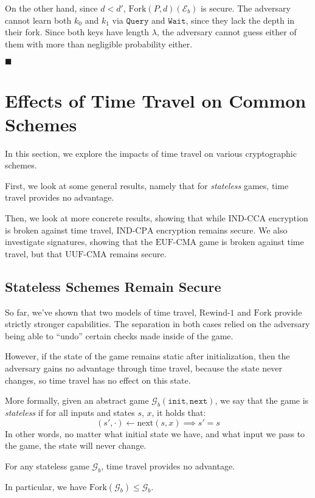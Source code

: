 On the other hand, since $d < d'$, $\text{Fork}(P, d)(\mathcal{E}_b)$
is secure.
The adversary cannot learn both $k_0$ and $k_1$ via $\texttt{Query}$
and $\texttt{Wait}$, since they lack the depth in their fork.
Since both keys have length $\lambda$, the adversary cannot guess
either of them with more than negligible probability either.


$\blacksquare$

\section{Effects of Time Travel on Common Schemes}
\label{sec:effect}

In this section, we explore the impacts of time travel on various
cryptographic schemes.

First, we look at some general results, namely that for \emph{stateless}
games, time travel provides no advantage.

Then, we look at more concrete results, showing that while $\text{IND-CCA}$
encryption is broken against time travel, $\text{IND-CPA}$ encryption
remains secure.
We also investigate signatures, showing that the $\text{EUF-CMA}$
game is broken against time travel, but that $\text{UUF-CMA}$ remains secure.

\subsection{Stateless Schemes Remain Secure}

So far, we've shown that two models of time travel, $\text{Rewind-1}$
and $\text{Fork}$ provide strictly stronger capabilities.
The separation in both cases relied on the adversary being able to
``undo'' certain checks made inside of the game.

However, if the state of the game remains static after initialization,
then the adversary gains no advantage through time travel,
because the state never changes, so time travel has no effect on this
state.

More formally, given an abstract game $\mathcal{G}_b(\texttt{init}, \texttt{next})$,
we say that the game is \emph{stateless} if for all inputs and states $s$, $x$, it holds that:
$$
(s', \cdot) \gets \text{next}(s, x) \implies s' = s
$$
In other words, no matter what initial state we have, and what input
we pass to the game, the state will never change.

\begin{claim}
\label{claim:stateless-games}
For any stateless game $\mathcal{G}_b$, time travel provides no advantage.

In particular, we have $\text{Fork}(\mathcal{G}_b) \leq \mathcal{G}_b$.
\end{claim}

